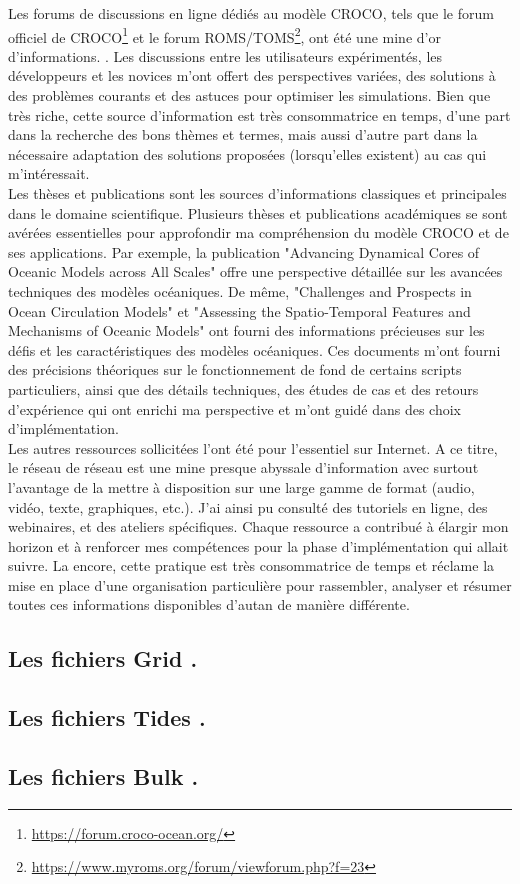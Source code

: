 Les forums de discussions en ligne dédiés au modèle CROCO, tels que le forum officiel de CROCO\footnote{\url{https://forum.croco-ocean.org/}} et le forum ROMS/TOMS\footnote{\url{https://www.myroms.org/forum/viewforum.php?f=23}}, ont été une mine d'or d'informations. \citep{croco_forum}. Les discussions entre les utilisateurs expérimentés, les développeurs et les novices m'ont offert des perspectives variées, des solutions à des problèmes courants et des astuces pour optimiser les simulations. Bien que très riche, cette source d'information est très consommatrice en temps, d'une part dans la recherche des bons thèmes et termes, mais aussi d'autre part dans la nécessaire adaptation des solutions proposées (lorsqu'elles existent) au cas qui m'intéressait.\\


Les thèses et publications sont les sources d'informations classiques et principales dans le domaine scientifique. Plusieurs thèses et publications académiques se sont avérées essentielles pour approfondir ma compréhension du modèle CROCO et de ses applications. Par exemple, la publication "Advancing Dynamical Cores of Oceanic Models across All Scales" \citep{advancingDynamicalCores} offre une perspective détaillée sur les avancées techniques des modèles océaniques. De même, "Challenges and Prospects in Ocean Circulation Models" \citep{challengesProspects} et "Assessing the Spatio-Temporal Features and Mechanisms of Oceanic Models" \citep{spatioTemporalFeatures} ont fourni des informations précieuses sur les défis et les caractéristiques des modèles océaniques. Ces documents m'ont fourni des précisions théoriques sur le fonctionnement de fond de certains scripts particuliers, ainsi que des détails techniques, des études de cas et des retours d'expérience qui ont enrichi ma perspective et m'ont guidé dans des choix d'implémentation.\\

Les autres ressources sollicitées l'ont été pour l'essentiel sur Internet. A ce titre, le réseau de réseau est une mine presque abyssale d'information avec surtout l'avantage de la mettre à disposition sur une large gamme de format (audio, vidéo, texte, graphiques, etc.). J'ai ainsi pu consulté des tutoriels en ligne, des webinaires, et des ateliers spécifiques\citep{croco_video}. Chaque ressource a contribué à élargir mon horizon et à renforcer mes compétences pour la phase d'implémentation qui allait suivre. La encore, cette pratique est très consommatrice de temps et réclame la mise en place d'une organisation particulière pour rassembler, analyser et résumer toutes ces informations disponibles d'autan de manière différente.


\subsection{Les fichiers \og Grid \fg{}.}


\subsection{Les fichiers \og Tides \fg{}.}
\label{sub:tides}


\subsection{Les fichiers \og Bulk \fg{}.}
\label{sub:bulk}

